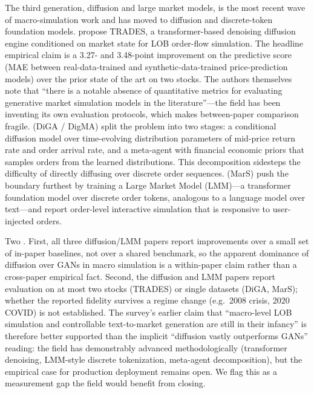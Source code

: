 The third generation, diffusion and large market models, is the most recent wave of macro-simulation work and has moved to diffusion and discrete-token foundation models. \citep{berti2025trades} propose TRADES, a transformer-based denoising diffusion engine conditioned on market state for LOB order-flow simulation. The headline empirical claim is a 3.27- and 3.48-point improvement on the predictive score (MAE between real-data-trained and synthetic-data-trained price-prediction models) over the prior state of the art on two stocks. The authors themselves note that ``there is a notable absence of quantitative metrics for evaluating generative market simulation models in the literature''---the field has been inventing its own evaluation protocols, which makes between-paper comparison fragile. \citep{huang2024diga} (DiGA / DigMA) split the problem into two stages: a conditional diffusion model over time-evolving distribution parameters of mid-price return rate and order arrival rate, and a meta-agent with financial economic priors that samples orders from the learned distributions. This decomposition sidesteps the difficulty of directly diffusing over discrete order sequences. \citep{li2025mars} (MarS) push the boundary furthest by training a Large Market Model (LMM)---a transformer foundation model over discrete order tokens, analogous to a language model over text---and report order-level interactive simulation that is responsive to user-injected orders.

Two . First, all three diffusion/LMM papers report improvements over a small set of in-paper baselines, not over a shared benchmark, so the apparent dominance of diffusion over GANs in macro simulation is a within-paper claim rather than a cross-paper empirical fact. Second, the diffusion and LMM papers report evaluation on at most two stocks (TRADES) or single datasets (DiGA, MarS); whether the reported fidelity survives a regime change (e.g.\ 2008 crisis, 2020 COVID) is not established. The survey's earlier claim that ``macro-level LOB simulation and controllable text-to-market generation are still in their infancy'' is therefore better supported than the implicit ``diffusion vastly outperforms GANs'' reading: the field has demonstrably advanced methodologically (transformer denoising, LMM-style discrete tokenization, meta-agent decomposition), but the empirical case for production deployment remains open. We flag this as a measurement gap the field would benefit from closing.

